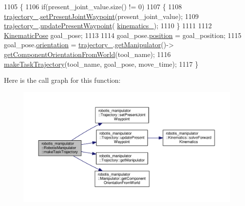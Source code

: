 \begin{DoxyCode}
1105 \{
1106   \textcolor{keywordflow}{if}(present\_joint\_value.size() != 0)
1107   \{
1108     \hyperlink{classrobotis__manipulator_1_1_robotis_manipulator_a992d2c7221bcaab8e9a688d12728d738}{trajectory\_}.\hyperlink{classrobotis__manipulator_1_1_trajectory_a58b1d4fb60f7e3ed9150d312766debc1}{setPresentJointWaypoint}(present\_joint\_value);
1109     \hyperlink{classrobotis__manipulator_1_1_robotis_manipulator_a992d2c7221bcaab8e9a688d12728d738}{trajectory\_}.\hyperlink{classrobotis__manipulator_1_1_trajectory_a05e95f1473723592130f63321664fb0c}{updatePresentWaypoint}(
      \hyperlink{classrobotis__manipulator_1_1_robotis_manipulator_a9a37fd068504dfe5fab346884790fc8f}{kinematics\_});
1110   \}
1111 
1112   \hyperlink{structrobotis__manipulator_1_1_kinematic_pose}{KinematicPose} goal\_pose;
1113 
1114   goal\_pose.\hyperlink{structrobotis__manipulator_1_1_kinematic_pose_a8700e7ae2388242cf540e884d52fd97a}{position} = goal\_position;
1115   goal\_pose.\hyperlink{structrobotis__manipulator_1_1_kinematic_pose_a0506da3cc344d21656fdd1befdd7fa27}{orientation} = \hyperlink{classrobotis__manipulator_1_1_robotis_manipulator_a992d2c7221bcaab8e9a688d12728d738}{trajectory\_}.\hyperlink{classrobotis__manipulator_1_1_trajectory_ae5276de42edf154de107c1f194f6b322}{getManipulator}()->
      \hyperlink{classrobotis__manipulator_1_1_manipulator_a9228f1f4b7fd627da2a618b79b2f0c0b}{getComponentOrientationFromWorld}(tool\_name);
1116   \hyperlink{classrobotis__manipulator_1_1_robotis_manipulator_af99e51e771170748507ac7c750b515da}{makeTaskTrajectory}(tool\_name, goal\_pose, move\_time);
1117 \}
\end{DoxyCode}


Here is the call graph for this function\+:\nopagebreak
\begin{figure}[H]
\begin{center}
\leavevmode
\includegraphics[width=350pt]{classrobotis__manipulator_1_1_robotis_manipulator_af99e51e771170748507ac7c750b515da_cgraph}
\end{center}
\end{figure}




